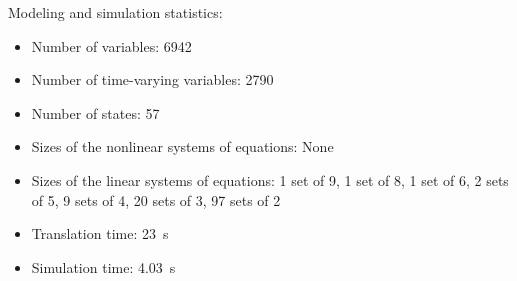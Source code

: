 \begin{contextbox}
  Modeling and simulation statistics:
  \begin{itemize}
    \item Number of variables: 6942
    \item Number of time-varying variables: 2790
    \item Number of states: 57
    \item Sizes of the nonlinear systems of equations: None
    \item Sizes of the linear systems of equations: 1 set of 9, 1 set of 8, 1 set of 6, 2 sets of 5, 9 sets of 4, 20 sets of 3, 97 sets of 2
    \item Translation time: \SI{23}{s}
    \item Simulation time: \SI{4.03}{s}
  \end{itemize}
\end{contextbox}